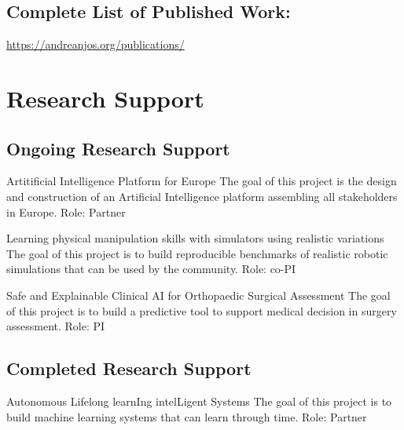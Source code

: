 \documentclass[a4paper]{nihbiosketch}
\begin{document}
\subsection*{Complete List of Published Work:}
\url{https://andreanjos.org/publications/}

\section{Research Support}

\subsection*{Ongoing Research Support}

{Artitificial Intelligence Platform for Europe}
{The goal of this project is the design and construction of an Artificial
    Intelligence platform assembling all stakeholders in Europe.}
{Role: Partner}

\bigskip

{Learning physical manipulation skills with simulators using realistic variations}
{The goal of this project is to build reproducible benchmarks of realistic
robotic simulations that can be used by the community.}
{Role: co-PI}

\bigskip

{Safe and Explainable Clinical AI for Orthopaedic Surgical Assessment}
{The goal of this project is to build a predictive tool to support medical
decision in surgery assessment.}
{Role: PI}

\subsection*{Completed Research Support}

{Autonomous Lifelong learnIng intelLigent Systems}
{The goal of this project is to build machine learning systems that can learn
through time.}
{Role: Partner}
\end{document}

